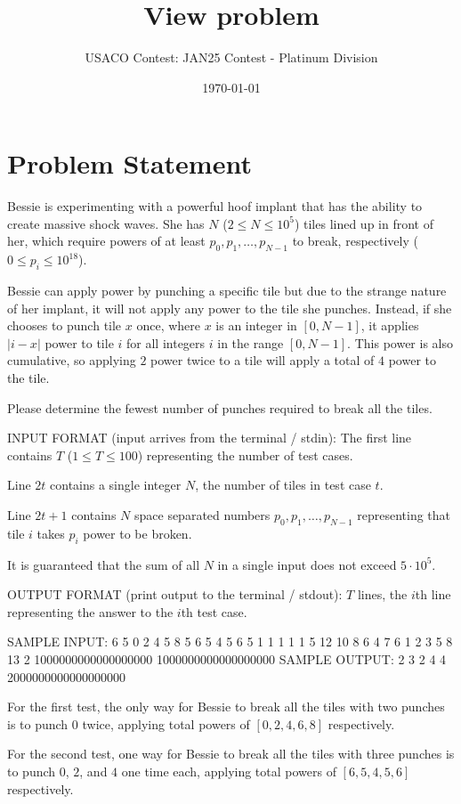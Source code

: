 \documentclass[12pt]{article}
\title{View problem}
\author{USACO Contest: JAN25 Contest - Platinum Division}
\date{\today}
\begin{document}
\maketitle

\section*{Problem Statement}


Bessie is experimenting with a powerful hoof implant that has the ability to
create massive shock waves. She has $N$ ($2 \leq N \leq 10^5$) tiles lined up in
front of her, which require powers of at least $p_0,p_1,\dots,p_{N-1}$ to break,
respectively
($0 \leq p_i \leq 10^{18}$).

Bessie can apply power by punching a specific tile but due to the strange nature
of her implant, it will not apply any power to the tile she punches. Instead, if
she chooses to punch tile $x$ once, where $x$ is an integer in $[0,N-1]$, 
it applies $|i-x|$ power to tile $i$ for all integers $i$ in the range
$[0,N-1]$. This power is also cumulative, so applying $2$ power twice to a tile
will apply a total of $4$ power to the tile. 

Please determine the fewest number of punches required to break all the tiles.

INPUT FORMAT (input arrives from the terminal / stdin):
The first line contains $T$ ($1 \leq T \leq 100$) representing the number of
test cases. 

Line $2t$ contains a single integer $N$, the number of tiles in test case $t$.

Line $2t+1$ contains $N$ space separated numbers $p_0,p_1, \ldots, p_{N-1}$ representing
that tile $i$ takes $p_i$ power to be broken.

It is guaranteed that the sum of all $N$ in a single input does not exceed
$5\cdot 10^5$.

OUTPUT FORMAT (print output to the terminal / stdout):
$T$ lines, the $i$th line representing the answer to the $i$th test case.

SAMPLE INPUT:
6
5
0 2 4 5 8
5
6 5 4 5 6
5
1 1 1 1 1
5
12 10 8 6 4
7
6 1 2 3 5 8 13
2
1000000000000000000 1000000000000000000
SAMPLE OUTPUT: 
2
3
2
4
4
2000000000000000000

For the first test, the only way for Bessie to break all the tiles with two
punches is to punch $0$ twice, applying total powers of $[0,2,4,6,8]$
respectively.

For the second test, one way for Bessie to break all the tiles with three
punches is to punch $0$, $2$, and $4$ one time each, applying total powers of
$[6,5,4,5,6]$ respectively.
\end{document}
